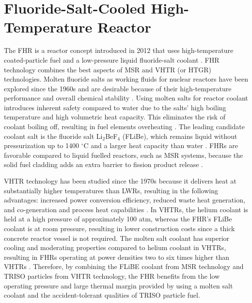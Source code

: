 \section{Fluoride-Salt-Cooled High-Temperature Reactor}
\label{sec:fhr}
The \gls{FHR} is a reactor concept introduced in 2012 that uses high-temperature 
coated-particle fuel and a low-pressure liquid fluoride-salt coolant 
\cite{forsberg_fluoride-salt-cooled_2012,facilitators_fluoride-salt-cooled_2013}.
\gls{FHR} technology combines the best aspects of \gls{MSR} and \gls{VHTR} 
(or \gls{HTGR}) technologies. 
Molten fluoride salts as working fluids for nuclear reactors have been explored 
since the 1960s and are desirable because of their high-temperature 
performance and overall chemical stability \cite{scarlat_design_2014}.  
Using molten salts for reactor coolant introduces inherent safety compared 
to water due to the salts' high boiling temperature and high volumetric 
heat capacity.
This eliminates the risk of coolant boiling off, resulting in fuel elements 
overheating \cite{ho_molten_2013}. 
The leading candidate coolant salt is the fluoride salt Li$_2$BeF$_4$ (FLiBe), 
which remains liquid without pressurization up to 1400 $^{\circ}$C and a larger 
heat capacity than water \cite{ho_molten_2013,forsberg_fluoride-salt-cooled_2012}. 
\glspl{FHR} are favorable compared to liquid fuelled reactors, such as
\gls{MSR} systems, because the solid fuel cladding adds an extra barrier to 
fission product release \cite{ho_molten_2013}.

\gls{VHTR} technology has been studied since the 1970s because it delivers 
heat at substantially higher temperatures than \glspl{LWR}, resulting in 
the following advantages: increased power conversion efficiency, reduced 
waste heat generation, and co-generation and process heat capabilities 
\cite{scarlat_design_2014}. 
In \glspl{VHTR}, the helium coolant is held at a high pressure of approximately 
100 atm, whereas the \gls{FHR}'s FLiBe coolant is at room pressure, resulting in lower 
construction costs since a thick concrete reactor vessel is not required.
The molten salt coolant has superior cooling and moderating properties compared 
to helium coolant in \glspl{VHTR}, resulting in \glspl{FHR} operating at 
power densities two to six times higher than  \glspl{VHTR} 
\cite{scarlat_design_2014,forsberg_fluoride-salt-cooled_2012}.
Therefore, by combining the FLiBE coolant from \gls{MSR} technology and 
\gls{TRISO} particles from \gls{VHTR} technology, the \gls{FHR} benefits from 
the low operating pressure and large thermal margin provided by using a molten 
salt coolant and the accident-tolerant qualities of \gls{TRISO} particle fuel. 

